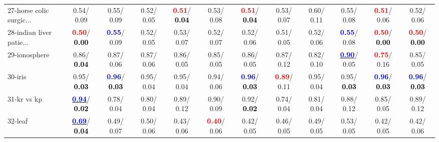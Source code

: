 \begin{table}[h]
\begin{center}
{\begin{tabular}{lc|c|c|c|c|c|c|c|c|c|c}
27-horse colic surgic... &   0.54/  0.09 &   0.55/  0.09 &   0.52/  0.05 & \textcolor{red}{\textbf{  0.51}}/\textcolor{black}{\textbf{  0.04}} &   0.53/  0.08 & \textcolor{red}{\textbf{  0.51}}/\textcolor{black}{\textbf{  0.04}} &   0.53/  0.07 &   0.60/  0.11 &   0.55/  0.08 & \textcolor{red}{\textbf{  0.51}}/  0.06 &   0.52/  0.06 \\
28-indian liver patie... & \textcolor{red}{\textbf{  0.50}}/\textcolor{black}{\textbf{  0.00}} & \textcolor{blue}{\textbf{  0.55}}/  0.09 &   0.52/  0.05 &   0.53/  0.07 &   0.52/  0.07 &   0.52/  0.06 &   0.51/  0.05 &   0.52/  0.06 & \textcolor{blue}{\textbf{  0.55}}/  0.08 & \textcolor{red}{\textbf{  0.50}}/\textcolor{black}{\textbf{  0.00}} & \textcolor{red}{\textbf{  0.50}}/\textcolor{black}{\textbf{  0.00}} \\ \hline
29-ionosphere &   0.86/\textcolor{black}{\textbf{  0.04}} &   0.87/  0.06 &   0.87/  0.06 &   0.86/  0.05 &   0.85/  0.05 &   0.86/  0.05 &   0.87/  0.12 &   0.82/  0.10 & \underline{\textcolor{blue}{\textbf{  0.90}}}/  0.05 & \textcolor{red}{\textbf{  0.75}}/  0.16 &   0.85/  0.05 \\
30-iris &   0.95/\textcolor{black}{\textbf{  0.03}} & \textcolor{blue}{\textbf{  0.96}}/\textcolor{black}{\textbf{  0.03}} &   0.95/  0.04 &   0.95/  0.04 &   0.94/  0.06 & \textcolor{blue}{\textbf{  0.96}}/\textcolor{black}{\textbf{  0.03}} & \textcolor{red}{\textbf{  0.89}}/  0.11 &   0.95/  0.04 &   0.95/\textcolor{black}{\textbf{  0.03}} & \textcolor{blue}{\textbf{  0.96}}/\textcolor{black}{\textbf{  0.03}} & \textcolor{blue}{\textbf{  0.96}}/\textcolor{black}{\textbf{  0.03}} \\
31-kr vs kp & \underline{\textcolor{blue}{\textbf{  0.94}}}/\textcolor{black}{\textbf{  0.02}} &   0.78/  0.04 &   0.80/  0.04 &   0.89/  0.12 &   0.90/  0.09 &   0.92/\textcolor{black}{\textbf{  0.02}} &   0.74/  0.04 &   0.81/  0.04 &   0.88/  0.12 &   0.85/  0.05 &   0.89/  0.12 \\
32-leaf & \underline{\textcolor{blue}{\textbf{  0.69}}}/\textcolor{black}{\textbf{  0.04}} &   0.49/  0.07 &   0.50/  0.06 &   0.43/  0.06 & \textcolor{red}{\textbf{  0.40}}/  0.06 &   0.42/  0.05 &   0.46/  0.05 &   0.49/  0.05 &   0.53/  0.05 &   0.42/  0.05 &   0.42/  0.06 \\\end{tabular}}\label{stratsBalAcc0aVFDT}
\end{center}
\end{table}
